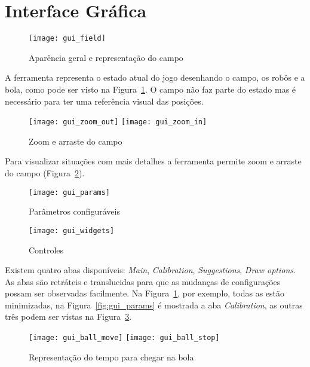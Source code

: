 \section{Interface Gráfica}\label{sec:gui}

\FloatBarrier

\begin{figure}[h]
  \centering
  \texttt{[image: gui\_field]}
  \caption{Aparência geral e representação do campo}\label{fig:gui_field}
\end{figure}

A ferramenta representa o estado atual do jogo desenhando o campo, os robôs e a
bola, como pode ser visto na Figura~\ref{fig:gui_field}.  O campo não faz parte
do estado mas é necessário para ter uma referência visual das posições.

\begin{figure}[h]
  \centering
  \texttt{[image: gui\_zoom\_out]}
  \texttt{[image: gui\_zoom\_in]}
  \caption{Zoom e arraste do campo}\label{fig:gui_zoom}
\end{figure}

Para visualizar situações com mais detalhes a ferramenta permite zoom e arraste
do campo (Figura~\ref{fig:gui_zoom}).

\FloatBarrier

\begin{figure}[h]
  \centering
  \texttt{[image: gui\_params]}
  \caption{Parâmetros configuráveis}\label{fig:gui_params}
  \texttt{[image: gui\_widgets]}
  \caption{Controles}\label{fig:gui_widgets}
\end{figure}

\FloatBarrier

Existem quatro abas disponíveis: \textit{Main}, \textit{Calibration},
\textit{Suggestions}, \textit{Draw options}. As abas são retráteis e
translucidas para que as mudanças de configurações possam ser observadas
facilmente.  Na Figura~\ref{fig:gui_field}, por exemplo, todas as estão
minimizadas, na Figura~\ref{fig:gui_params} é mostrada a aba
\textit{Calibration}, as outras três podem ser vistas na
Figura~\ref{fig:gui_widgets}.

\begin{figure}[h]
  \centering
  \texttt{[image: gui\_ball\_move]}
  \texttt{[image: gui\_ball\_stop]}
  \caption{Representação do tempo para chegar na bola}\label{fig:gui_ball}
\end{figure}

